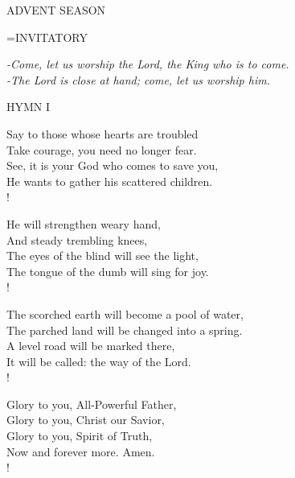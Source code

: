 \begin{center}\normalsize ADVENT SEASON\\
\end{center}

\hangindent=\parindent \small{INVITATORY}
\begin{center}
\textit{-Come, let us worship the Lord, the King who is to come.\\}
\textit{-The Lord is close at hand; come, let us worship him.\\}
\end{center}

\noindent\small{\uppercase{Hymn I }}\normalsize\label{advent:firstHymn}
\begin{cverse}
Say to those whose hearts are troubled\\
Take courage, you need no longer fear.\\
See, it is your God who comes to save you,\\
He wants to gather his scattered children.\\!

He will strengthen weary hand,\\
And steady trembling knees,\\
The eyes of the blind will see the light,\\
The tongue of the dumb will sing for joy.\\!

The scorched earth will become a pool of water,\\
The parched land will be changed into a spring.\\
A level road will be marked there,\\
It will be called: the way of the Lord.\\!

Glory to you, All-Powerful Father,\\
Glory to you, Christ our Savior,\\
Glory to you, Spirit of Truth,\\
Now and forever more. Amen.\\!
\end{cverse}

